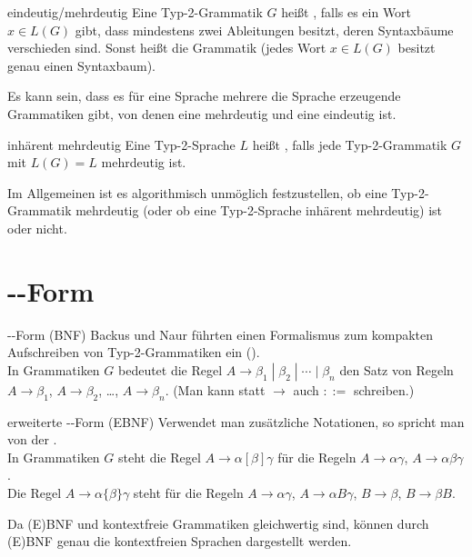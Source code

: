 \linie

\begin{Def}{eindeutig/mehrdeutig}
    Eine Typ-2-Grammatik $G$ heißt , falls es ein Wort\\
    $x \in L(G)$ gibt, dass mindestens zwei Ableitungen besitzt, deren
    Syntaxbäume verschieden sind.
    Sonst heißt die Grammatik 
    (jedes Wort $x \in L(G)$ besitzt genau einen Syntaxbaum).
\end{Def}

\begin{Bem}
    Es kann sein, dass es für eine Sprache mehrere die Sprache erzeugende
    Grammatiken gibt, von denen eine mehrdeutig und eine eindeutig ist.
\end{Bem}

\begin{Def}{inhärent mehrdeutig}
    Eine Typ-2-Sprache $L$ heißt , falls
    jede Typ-2-Grammatik $G$ mit $L(G) = L$ mehrdeutig ist.
\end{Def}

\begin{Bem}
    Im Allgemeinen ist es algorithmisch unmöglich festzustellen, ob eine
    Typ-2-Gram\-matik mehrdeutig
    (oder ob eine Typ-2-Sprache inhärent mehrdeutig) ist oder nicht.
\end{Bem}

\section{%
    --Form%
}

\begin{Def}{--Form (BNF)}
    Backus und Naur führten einen Formalismus zum kompakten Aufschreiben
    von Typ-2-Grammatiken ein
    ().\\
    In Grammatiken $G$ bedeutet die Regel
    $A \rightarrow \beta_1 \;|\; \beta_2 \;|\; \dotsb \;|\; \beta_n$
    den Satz von Regeln\\
    $A \rightarrow \beta_1$,
    $A \rightarrow \beta_2$, \dots,
    $A \rightarrow \beta_n$.
    (Man kann statt $\rightarrow$ auch $::=$ schreiben.)
\end{Def}

\begin{Def}{erweiterte --Form (EBNF)}
    Verwendet man zusätzliche Notationen, so spricht man von der
    .\\
    In Grammatiken $G$ steht die Regel $A \rightarrow \alpha [\beta] \gamma$
    für die Regeln $A \rightarrow \alpha \gamma$,
    $A \rightarrow \alpha \beta \gamma$.\\
    Die Regel $A \rightarrow \alpha \{\beta\} \gamma$ steht für die Regeln
    $A \rightarrow \alpha \gamma$, $A \rightarrow \alpha B \gamma$,
    $B \rightarrow \beta$, $B \rightarrow \beta B$.
\end{Def}

\begin{Bem}
    Da (E)BNF und kontextfreie Grammatiken gleichwertig sind, können durch\\
    (E)BNF genau die kontextfreien Sprachen dargestellt werden.
\end{Bem}

\pagebreak
